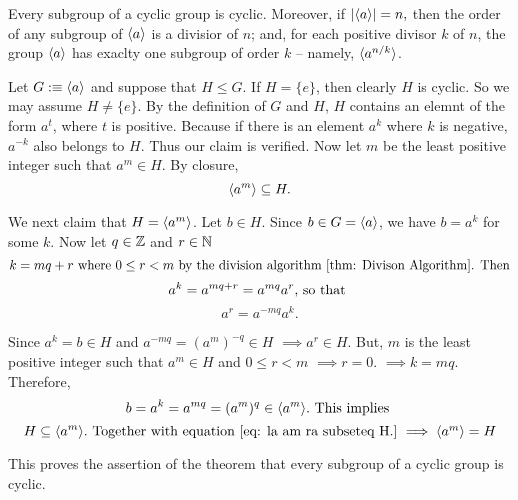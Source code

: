 \begin{thm}
  Every subgroup of a cyclic group is cyclic. Moreover, if $\abs{\langle a \rangle } = n,$ then the order of any subgroup of $\langle a \rangle$ is a divisior of $n$; and, for each positive divisor $k$ of $n$, the group $\langle a \rangle$ has exaclty one subgroup of order $k$ -- namely, $\langle a^{n/k} \rangle$.
\end{thm}
\begin{prf}
  Let $G :\equiv \langle a \rangle$ and suppose that $H \leq G$. If $H=\{ e\}$, then clearly $H$ is cyclic. So we may assume $H \neq \{e\}.$ By the definition of $G$ and $H$, $H$ contains an elemnt of the form $a^t$, where $t$ is positive. Because if there is an element $a^k$ where $k$ is negative, $a^{-k}$ also belongs to $H$. Thus our claim is verified. Now let $m$ be the least positive integer such that $a^m \in H$. By closure,
  \begin{equation}
    \label{eq: la am ra subseteq H.}
    \langle a^m \rangle \subseteq H.
  \end{equation}

  We next claim that $H=\langle a^m \rangle$. Let $b \in H$. Since $b \in G = \langle a \rangle$, we have $b = a^k$ for some $k$. Now let $q \in \mathbb{Z}$ and $r \in \mathbb{N}$ \st
  \begin{equation}
    k = mq + r $ where $ 0 \leq r < m $ by the division algorithm \ref{thm: Divison Algorithm}. Then$
  \end{equation}
  \begin{equation}
    a^k = a^{mq+r} = a^{mq}a^r, $ so that $
  \end{equation}
  \begin{equation}
    a^r=a^{-mq}a^k.
  \end{equation}

  Since $a^k = b \in H$ and $a^{-mq}=(a^m)^{-q} \in H$
  $\implies a^{r} \in H$. But, $m$ is the least positive integer such that $a^m \in H$ and $ 0 \leq r < m $ $\implies r=0$. $\implies k=mq$. Therefore,
  \begin{equation}
    b = a^k = a^{mq} = (a^m)^q \in \la a^m \ra. $ This implies $
  \end{equation}
  \begin{equation}
    H \subseteq \la a^m \ra.$ Together with equation \eqref{eq: la am ra subseteq H.} $ \implies \la a^m \ra = H
  \end{equation}

  This proves the assertion of the theorem that every subgroup of a cyclic group is cyclic.


\end{prf}
